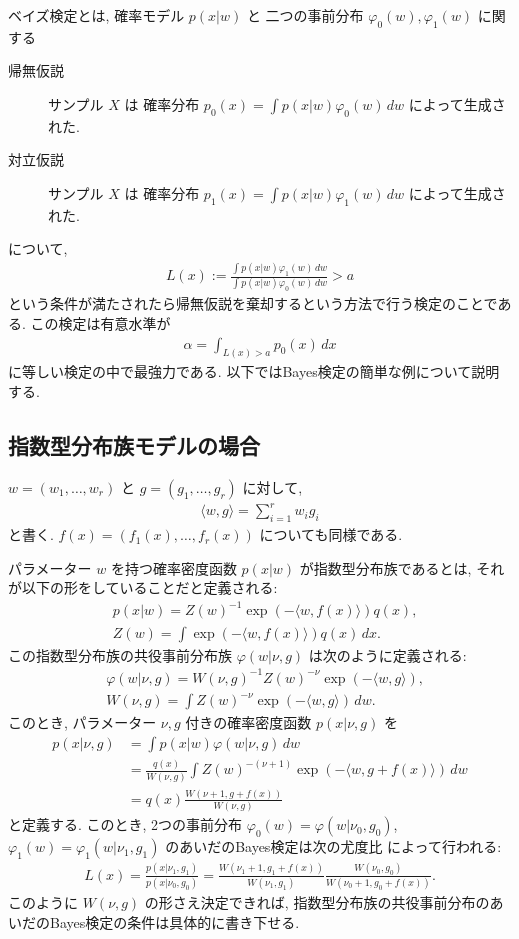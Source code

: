 \documentclass[12pt,twoside]{jarticle}
\newcommand\bra{\langle}
\newcommand\ket{\rangle}
\theoremstyle{jplain}
\theoremstyle{jplain}
\theoremstyle{jplain}
\numberwithin{theorem}{section}
\numberwithin{equation}{section}
\numberwithin{figure}{section}
\numberwithin{table}{section}
\begin{document}
ベイズ検定とは, 確率モデル $p(x|w)$ と
二つの事前分布 $\varphi_0(w), \varphi_1(w)$ に関する
\begin{description}
  \item[帰無仮説] サンプル $X$ は
  確率分布 $p_0(x) = \int p(x|w)\varphi_0(w)\,dw$ によって生成された.
  \item[対立仮説] サンプル $X$ は
  確率分布 $p_1(x) = \int p(x|w)\varphi_1(w)\,dw$ によって生成された.
\end{description}
について,
\begin{align*}
  L(x) := \frac{\int p(x|w)\varphi_1(w)\,dw}{\int p(x|w)\varphi_0(w)\,dw}
  > a
\end{align*}
という条件が満たされたら帰無仮説を棄却するという方法で行う検定のことである.
この検定は有意水準が
\begin{align*}
  \alpha = \int_{L(x)>a} p_0(x)\,dx
\end{align*}
に等しい検定の中で最強力である.
以下ではBayes検定の簡単な例について説明する.

\subsection{指数型分布族モデルの場合}

$w=(w_1,\ldots,w_r)$ と $g=(g_1,\ldots,g_r)$ に対して,
\begin{align*}
  \bra w, g\ket = \sum_{i=1}^r w_i g_i
\end{align*}
と書く. $f(x)=(f_1(x),\ldots,f_r(x))$ についても同様である.

パラメーター $w$ を持つ確率密度函数 $p(x|w)$ が指数型分布族であるとは,
それが以下の形をしていることだと定義される:
\begin{align*}
  &
  p(x|w) = Z(w)^{-1} \exp(-\bra w, f(x)\ket) q(x),
  \\ &
  Z(w) = \int \exp(-\bra w, f(x)\ket) q(x)\,dx.
\end{align*}
この指数型分布族の共役事前分布族 $\varphi(w|\nu,g)$ は次のように定義される:
\begin{align*}
  &
  \varphi(w|\nu,g) = W(\nu,g)^{-1}Z(w)^{-\nu}\exp(-\bra w,g\ket),
  \\ &
  W(\nu,g) = \int Z(w)^{-\nu}\exp(-\bra w, g\ket)\,dw.
\end{align*}
このとき, パラメーター $\nu,g$ 付きの確率密度函数 $p(x|\nu,g)$ を
\begin{align*}
  p(x|\nu,g) &= \int p(x|w)\varphi(w|\nu,g)\,dw
  \\ &
  = \frac{q(x)}{W(\nu,g)}\int Z(w)^{-(\nu+1)}\exp(-\bra w, g+f(x)\ket)\,dw
  \\ &
  = q(x)\frac{W(\nu+1,g+f(x))}{W(\nu,g)}
\end{align*}
と定義する. このとき, 2つの事前分布 $\varphi_0(w)=\varphi(w|\nu_0,g_0)$,
$\varphi_1(w)=\varphi_1(w|\nu_1,g_1)$ のあいだのBayes検定は次の尤度比
によって行われる:
\begin{align*}
  L(x) = \frac{p(x|\nu_1,g_1)}{p(x|\nu_0,g_0)}
  =
  \frac{W(\nu_1+1, g_1+f(x))}{W(\nu_1, g_1)}
  \frac{W(\nu_0, g_0)}{W(\nu_0+1, g_0+f(x))}.
\end{align*}
このように $W(\nu,g)$ の形さえ決定できれば,
指数型分布族の共役事前分布のあいだのBayes検定の条件は具体的に書き下せる.
\end{document}
